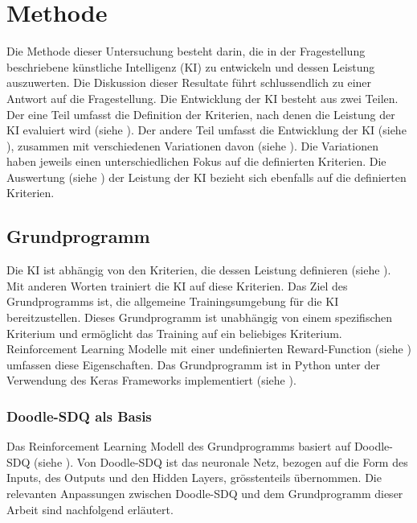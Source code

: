 \chapter{Methode}\label{chap:m}
Die Methode dieser Untersuchung besteht darin, die in der Fragestellung
beschriebene künstliche Intelligenz (KI) zu entwickeln und dessen Leistung
auszuwerten. Die Diskussion dieser Resultate führt schlussendlich zu einer
Antwort auf die Fragestellung. Die Entwicklung der KI besteht aus zwei Teilen.
Der eine Teil umfasst die Definition der Kriterien, nach denen die Leistung der
KI evaluiert wird (siehe ). Der andere Teil umfasst die
Entwicklung der KI (siehe ), zusammen mit verschiedenen
Variationen davon (siehe ). Die Variationen haben jeweils
einen unterschiedlichen Fokus auf die definierten Kriterien. Die Auswertung
(siehe ) der Leistung der KI bezieht sich ebenfalls
auf die definierten Kriterien.
 
\section{Grundprogramm}\label{chap:m_grund} Die KI ist abhängig von den
Kriterien, die dessen Leistung definieren (siehe ). Mit
anderen Worten trainiert die KI auf diese Kriterien. Das Ziel des
Grundprogramms ist, die allgemeine Trainingsumgebung für die KI
bereitzustellen. Dieses Grundprogramm ist unabhängig von einem spezifischen
Kriterium und ermöglicht das Training auf ein beliebiges Kriterium.
Reinforcement Learning Modelle mit einer undefinierten Reward-Function (siehe
) umfassen diese Eigenschaften. Das Grundprogramm ist
in Python unter der Verwendung des Keras Frameworks implementiert (siehe
).
 
\subsection{Doodle-SDQ als Basis}\label{sub:m_grund_dood} Das Reinforcement
Learning Modell des Grundprogramms basiert auf Doodle-SDQ (siehe
). Von Doodle-SDQ ist das neuronale Netz, bezogen auf
die Form des Inputs, des Outputs und den Hidden Layers, grösstenteils
übernommen. Die relevanten Anpassungen zwischen Doodle-SDQ und dem Grundprogramm
dieser Arbeit sind nachfolgend erläutert.
 

